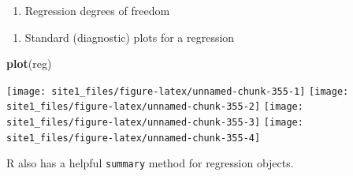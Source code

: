 \documentclass[]{book}
\newenvironment{Shaded}{\begin{snugshade}}{\end{snugshade}}
\newcommand{\KeywordTok}[1]{\textcolor[rgb]{0.13,0.29,0.53}{\textbf{#1}}}
\newcommand{\CommentTok}[1]{\textcolor[rgb]{0.56,0.35,0.01}{\textit{#1}}}
\newcommand{\OperatorTok}[1]{\textcolor[rgb]{0.81,0.36,0.00}{\textbf{#1}}}
\newcommand{\NormalTok}[1]{#1}
\providecommand{\tightlist}{%
  \setlength{\itemsep}{0pt}\setlength{\parskip}{0pt}}
\begin{document}
\begin{enumerate}
\def\labelenumi{\arabic{enumi}.}
\setcounter{enumi}{2}
\tightlist
\item
  Regression degrees of freedom
\end{enumerate}

\begin{Shaded}
\end{Shaded}

\begin{enumerate}
\def\labelenumi{\arabic{enumi}.}
\setcounter{enumi}{3}
\tightlist
\item
  Standard (diagnostic) plots for a regression
\end{enumerate}

\begin{Shaded}
\begin{Highlighting}[]
\KeywordTok{plot}\NormalTok{(reg)}
\end{Highlighting}
\end{Shaded}

\begin{center}\texttt{[image: site1\_files/figure-latex/unnamed-chunk-355-1]} \texttt{[image: site1\_files/figure-latex/unnamed-chunk-355-2]} \texttt{[image: site1\_files/figure-latex/unnamed-chunk-355-3]} \texttt{[image: site1\_files/figure-latex/unnamed-chunk-355-4]} \end{center}

R also has a helpful \texttt{summary} method for regression objects.
\end{document}
